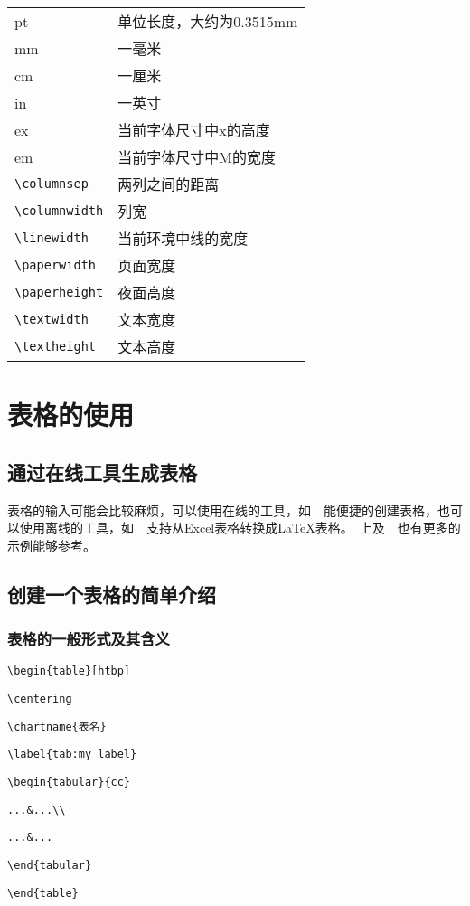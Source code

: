 \begin{tabular}{ll}
pt & 单位长度，大约为0.3515mm \\
mm & 一毫米 \\
cm & 一厘米 \\
in & 一英寸 \\
ex & 当前字体尺寸中x的高度 \\
em & 当前字体尺寸中M的宽度 \\
\verb|\columnsep| & 两列之间的距离 \\
\verb|\columnwidth| & 列宽 \\
\verb|\linewidth| & 当前环境中线的宽度 \\
\verb|\paperwidth| & 页面宽度 \\
\verb|\paperheight| & 夜面高度 \\
\verb|\textwidth| & 文本宽度 \\
\verb|\textheight| & 文本高度 \\
\end{tabular}

\section{表格的使用}

\subsection{通过在线工具生成表格}
表格的输入可能会比较麻烦，可以使用在线的工具，如~~能便捷的创建表格，也可以使用离线的工具，如~~支持从Excel表格转换成\LaTeX{}表格。~上及~~也有更多的示例能够参考。

\subsection{创建一个表格的简单介绍}
\subsubsection{表格的一般形式及其含义}

\verb|\begin{table}[htbp]|\par 
\verb|\centering|\par 
\verb|\chartname{表名}|\par 
\verb|\label{tab:my_label}|\par 
\verb|\begin{tabular}{cc}|\par 
\verb|...&...\\|\par 
\verb|...&...|\par 
\verb|\end{tabular}|\par 
\verb|\end{table}|\par 

